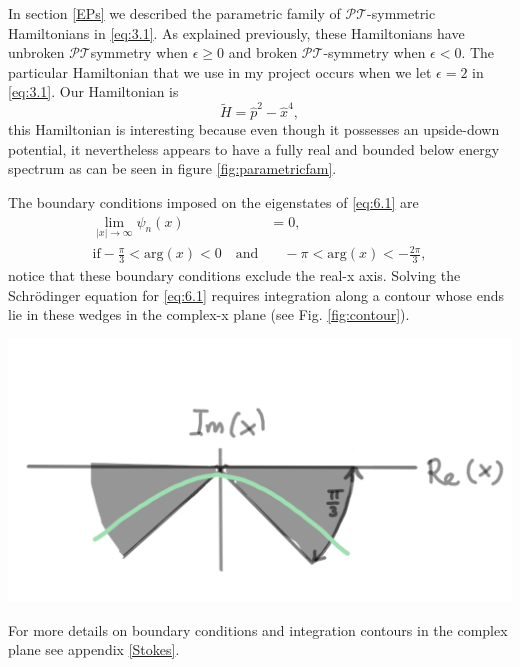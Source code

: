 \documentclass[12pt, a4paper]{report}
\newenvironment{Figure}
    {\par\medskip\noindent\minipage{\linewidth}}
    {\endminipage\par\medskip}
\newcommand\PT{\(\mathcal{PT}\)}
\begin{document}
In section \ref{EPs} we described the parametric family of \PT-symmetric Hamiltonians in \ref{eq:3.1}. As explained previously, these Hamiltonians have unbroken \PT\:symmetry when $\epsilon \geq 0$ and broken \PT-symmetry when $\epsilon < 0$. The particular Hamiltonian that we use in my project occurs when we let $\epsilon = 2$ in \ref{eq:3.1}. Our Hamiltonian is 
\begin{equation}\label{eq:6.1}
\tilde{H} = \hat{p}^2 - \hat{x}^{4},
\end{equation}
this Hamiltonian is interesting because even though it possesses an upside-down potential, it nevertheless appears to have a fully real and bounded below energy spectrum\cite{UpsideDownPotentials} as can be seen in figure \ref{fig:parametricfam}. 

The boundary conditions imposed on the eigenstates of \ref{eq:6.1} are
\begin{align}\label{eq:6.2}
\lim_{|x|\rightarrow \infty} \psi_n(x) &= 0, \nonumber\\
\mathrm{if}-\frac{\pi}{3} < \mathrm{arg}(x) < 0 \quad\mathrm{and}&\quad-\pi < \mathrm{arg}(x) < -\frac{2\pi}{3},
\end{align}
notice that these boundary conditions exclude the real-x axis. Solving the Schr\"{o}dinger equation for \ref{eq:6.1} requires integration along a contour whose ends lie in these wedges in the complex-x plane\cite{UpsideDownPotentials} (see Fig. \ref{fig:contour}).
\begin{Figure}
\centering
\includegraphics[width=.6\linewidth]{contour.pdf}
\label{fig:contour}
\end{Figure}

For more details on boundary conditions and integration contours in the complex plane see appendix \ref{Stokes}.
\end{document}
